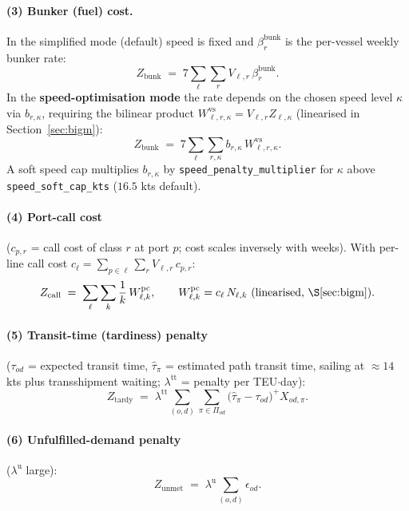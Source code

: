 \documentclass[11pt]{article}
\begin{document}
\paragraph{(3) Bunker (fuel) cost.} In the simplified mode (default) speed is fixed and
$\beta^{\text{bunk}}_r$ is the per-vessel weekly bunker rate:
\begin{equation}
  Z_{\text{bunk}} \;=\; 7\sum_{\ell}\sum_{r} V_{\ell,r}\,\beta^{\text{bunk}}_r .
\end{equation}
In the \textbf{speed-optimisation mode} the rate depends on the chosen speed level
$\kappa$ via $b_{r,\kappa}$, requiring the bilinear product
$W^{\text{vs}}_{\ell,r,\kappa}=V_{\ell,r}Z_{\ell,\kappa}$ (linearised in
Section~\ref{sec:bigm}):
\begin{equation}
  Z_{\text{bunk}} \;=\; 7\sum_{\ell}\sum_{r,\kappa} b_{r,\kappa}\, W^{\text{vs}}_{\ell,r,\kappa}.
\end{equation}
A soft speed cap multiplies $b_{r,\kappa}$ by \texttt{speed\_penalty\_multiplier} for
$\kappa$ above \texttt{speed\_soft\_cap\_kts} ($16.5$ kts default).

\paragraph{(4) Port-call cost} ($c_{p,r}$ = call cost of class $r$ at port $p$; cost
scales inversely with weeks). With per-line call cost
$c_\ell=\sum_{p\in\ell}\sum_r V_{\ell,r}\,c_{p,r}$:
\begin{equation}
  Z_{\text{call}} \;=\; \sum_{\ell}\sum_{k} \frac{1}{k}\, W^{\text{pc}}_{\ell,k},
  \qquad W^{\text{pc}}_{\ell,k} = c_\ell\, N_{\ell,k}\ \text{(linearised, \S\ref{sec:bigm})}.
\end{equation}

\paragraph{(5) Transit-time (tardiness) penalty} ($\tau_{od}$ = expected transit time,
$\hat\tau_\pi$ = estimated path transit time, sailing at $\approx 14$ kts plus
transshipment waiting; $\lambda^{\text{tt}}$ = penalty per TEU$\cdot$day):
\begin{equation}
  Z_{\text{tardy}} \;=\; \lambda^{\text{tt}}\sum_{(o,d)}\sum_{\pi\in\Pi_{od}}
  \big(\hat\tau_\pi - \tau_{od}\big)^{+} X_{od,\pi}.
\end{equation}

\paragraph{(6) Unfulfilled-demand penalty} ($\lambda^{\text{u}}$ large):
\begin{equation}
  Z_{\text{unmet}} \;=\; \lambda^{\text{u}}\sum_{(o,d)} \epsilon_{od}.
\end{equation}
\end{document}
